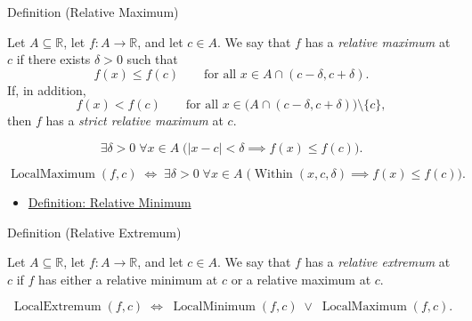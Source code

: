 \begin{definitionbox}{Definition (Relative Maximum)}
\begin{definition}
\label{def:relative-maximum}
Let $A \subseteq \mathbb{R}$, let $f : A \to \mathbb{R}$, and let $c \in A$. We say that $f$ has a \emph{relative maximum} at $c$ if there exists $\delta > 0$ such that
\[
f(x) \leq f(c) \qquad \text{for all } x \in A \cap (c-\delta,c+\delta).
\]
If, in addition,
\[
f(x) < f(c) \qquad \text{for all } x \in \bigl(A \cap (c-\delta,c+\delta)\bigr)\setminus\{c\},
\]
then $f$ has a \emph{strict relative maximum} at $c$.
\end{definition}
\end{definitionbox}

\begin{remark*}
\[
\exists \delta > 0\;\forall x \in A\;
\bigl(|x - c| < \delta \implies f(x) \leq f(c)\bigr).
\]
\end{remark*}

\begin{remark*}
\[
\operatorname{LocalMaximum}(f, c)
\;\Longleftrightarrow\;
\exists \delta > 0\;\forall x \in A\;
\bigl(\operatorname{Within}(x, c, \delta) \implies f(x) \leq f(c)\bigr).
\]
\end{remark*}

\begin{dependencies}
\begin{itemize}
  \item \hyperref[def:relative-minimum]{Definition: Relative Minimum}
\end{itemize}
\end{dependencies}


\begin{definitionbox}{Definition (Relative Extremum)}
\begin{definition}
\label{def:relative-extremum}
Let $A \subseteq \mathbb{R}$, let $f : A \to \mathbb{R}$, and let $c \in A$. We say that $f$ has a \emph{relative extremum} at $c$ if $f$ has either a relative minimum at $c$ or a relative maximum at $c$.
\end{definition}
\end{definitionbox}

\begin{remark*}
\[
\operatorname{LocalExtremum}(f, c)
\;\Longleftrightarrow\;
\operatorname{LocalMinimum}(f, c) \;\lor\; \operatorname{LocalMaximum}(f, c).
\]
\end{remark*}


